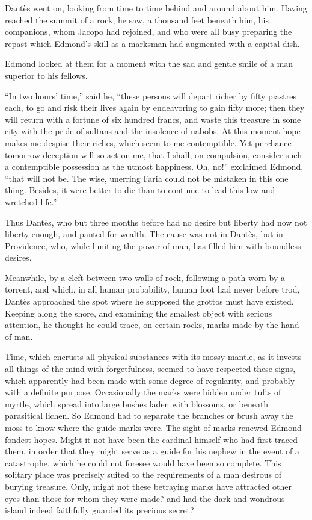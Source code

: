 Dantès went on, looking from time to time behind and around about him.
Having reached the summit of a rock, he saw, a thousand feet beneath
him, his companions, whom Jacopo had rejoined, and who were all busy
preparing the repast which Edmond’s skill as a marksman had augmented
with a capital dish.

Edmond looked at them for a moment with the sad and gentle smile of a
man superior to his fellows.

“In two hours’ time,” said he, “these persons will depart richer by
fifty piastres each, to go and risk their lives again by endeavoring to
gain fifty more; then they will return with a fortune of six hundred
francs, and waste this treasure in some city with the pride of sultans
and the insolence of nabobs. At this moment hope makes me despise their
riches, which seem to me contemptible. Yet perchance tomorrow deception
will so act on me, that I shall, on compulsion, consider such a
contemptible possession as the utmost happiness. Oh, no!” exclaimed
Edmond, “that will not be. The wise, unerring Faria could not be
mistaken in this one thing. Besides, it were better to die than to
continue to lead this low and wretched life.”

Thus Dantès, who but three months before had no desire but liberty had
now not liberty enough, and panted for wealth. The cause was not in
Dantès, but in Providence, who, while limiting the power of man, has
filled him with boundless desires.

Meanwhile, by a cleft between two walls of rock, following a path worn
by a torrent, and which, in all human probability, human foot had never
before trod, Dantès approached the spot where he supposed the grottos
must have existed. Keeping along the shore, and examining the smallest
object with serious attention, he thought he could trace, on certain
rocks, marks made by the hand of man.

Time, which encrusts all physical substances with its mossy mantle, as
it invests all things of the mind with forgetfulness, seemed to have
respected these signs, which apparently had been made with some degree
of regularity, and probably with a definite purpose. Occasionally the
marks were hidden under tufts of myrtle, which spread into large bushes
laden with blossoms, or beneath parasitical lichen. So Edmond had to
separate the branches or brush away the moss to know where the
guide-marks were. The sight of marks renewed Edmond fondest hopes.
Might it not have been the cardinal himself who had first traced them,
in order that they might serve as a guide for his nephew in the event
of a catastrophe, which he could not foresee would have been so
complete. This solitary place was precisely suited to the requirements
of a man desirous of burying treasure. Only, might not these betraying
marks have attracted other eyes than those for whom they were made? and
had the dark and wondrous island indeed faithfully guarded its precious
secret?

